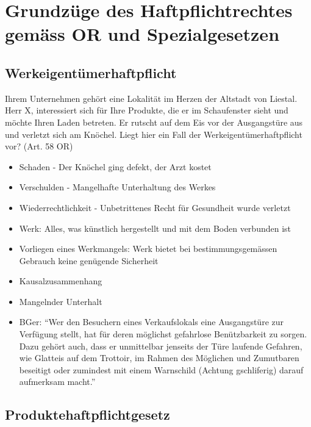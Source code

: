 \hypertarget{grundzuxfcge-des-haftpflichtrechtes-gemuxe4ss-or-und-spezialgesetzen}{%
\section{Grundzüge des Haftpflichtrechtes gemäss OR und
Spezialgesetzen}\label{grundzuxfcge-des-haftpflichtrechtes-gemuxe4ss-or-und-spezialgesetzen}}

\hypertarget{werkeigentuxfcmerhaftpflicht}{%
\subsection{Werkeigentümerhaftpflicht}\label{werkeigentuxfcmerhaftpflicht}}

Ihrem Unternehmen gehört eine Lokalität im Herzen der Altstadt von
Liestal. Herr X, interessiert sich für Ihre Produkte, die er im
Schaufenster sieht und möchte Ihren Laden betreten. Er rutscht auf dem
Eis vor der Ausgangstüre aus und verletzt sich am Knöchel. Liegt hier
ein Fall der Werkeigentümerhaftpflicht vor? (Art. 58 OR)

\begin{itemize}
\tightlist
\item
  Schaden - Der Knöchel ging defekt, der Arzt kostet
\item
  Verschulden - Mangelhafte Unterhaltung des Werkes
\item
  Wiederrechtlichkeit - Unbetrittenes Recht für Gesundheit wurde
  verletzt
\item
  Werk: Alles, was künstlich hergestellt und mit dem Boden verbunden ist
\item
  Vorliegen eines Werkmangels: Werk bietet bei bestimmungsgemässen
  Gebrauch keine genügende Sicherheit
\item
  Kausalzusammenhang
\item
  Mangelnder Unterhalt
\item
  BGer: ``Wer den Besuchern eines Verkaufslokals eine Ausgangstüre zur
  Verfügung stellt, hat für deren möglichst gefahrlose Benützbarkeit zu
  sorgen. Dazu gehört auch, dass er unmittelbar jenseits der Türe
  laufende Gefahren, wie Glatteis auf dem Trottoir, im Rahmen des
  Möglichen und Zumutbaren beseitigt oder zumindest mit einem Warnschild
  (Achtung gschliferig) darauf aufmerksam macht.''
\end{itemize}

\hypertarget{produktehaftpflichtgesetz}{%
\subsection{Produktehaftpflichtgesetz}\label{produktehaftpflichtgesetz}}

